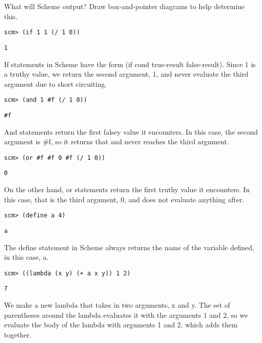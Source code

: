 \begin{blocksection}
\question What will Scheme output? Draw box-and-pointer diagrams to help determine this.

\begin{lstlisting}
scm> (if 1 1 (/ 1 0))
\end{lstlisting}
\begin{solution}[0.25in]
\begin{lstlisting}
1
\end{lstlisting}
If statements in Scheme have the form (if cond true-result false-result). Since 1 is a truthy value, we return the second argument, 1, and never evaluate the third argument due to short circuiting.
\end{solution}

\begin{lstlisting}
scm> (and 1 #f (/ 1 0))
\end{lstlisting}
\begin{solution}[0.25in]
\begin{lstlisting}
#f
\end{lstlisting}
And statements return the first falsey value it encounters. In this case, the second argument is #f, so it returns that and never reaches the third argument.
\end{solution}

\begin{lstlisting}
scm> (or #f #f 0 #f (/ 1 0))
\end{lstlisting}
\begin{solution}[0.25in]
\begin{lstlisting}
0
\end{lstlisting}
On the other hand, or statements return the first truthy value it encounters. In this case, that is the third argument, 0, and does not evaluate anything after.
\end{solution}

\begin{lstlisting}
scm> (define a 4)
\end{lstlisting}
\begin{solution}[0.25in]
\begin{lstlisting}
a
\end{lstlisting}
The define statement in Scheme always returns the name of the variable defined, in this case, a.
\end{solution}

\begin{lstlisting}
scm> ((lambda (x y) (+ a x y)) 1 2)
\end{lstlisting}
\begin{solution}[0.25in]
\begin{lstlisting}
7
\end{lstlisting}
We make a new lambda that takes in two arguments, x and y. The set of parentheses around the lambda evaluates it with the arguments 1 and 2, so we evaluate the body of the lambda with arguments 1 and 2, which adds them together.
\end{solution}


\end{blocksection}

